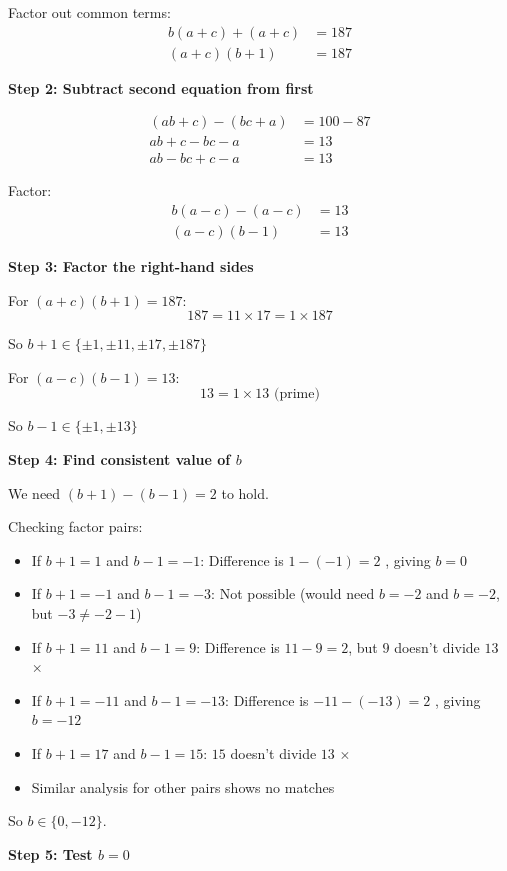 \documentclass[12pt]{article}
\begin{document}
Factor out common terms:
\begin{align*}
b(a + c) + (a + c) &= 187\\
(a + c)(b + 1) &= 187
\end{align*}

\textbf{Step 2: Subtract second equation from first}

\begin{align*}
(ab + c) - (bc + a) &= 100 - 87\\
ab + c - bc - a &= 13\\
ab - bc + c - a &= 13
\end{align*}

Factor:
\begin{align*}
b(a - c) - (a - c) &= 13\\
(a - c)(b - 1) &= 13
\end{align*}

\textbf{Step 3: Factor the right-hand sides}

For $(a+c)(b+1) = 187$:
\[187 = 11 \times 17 = 1 \times 187\]

So $b+1 \in \{\pm 1, \pm 11, \pm 17, \pm 187\}$

For $(a-c)(b-1) = 13$:
\[13 = 1 \times 13 \text{ (prime)}\]

So $b-1 \in \{\pm 1, \pm 13\}$

\textbf{Step 4: Find consistent value of $b$}

We need $(b+1) - (b-1) = 2$ to hold.

Checking factor pairs:
\begin{itemize}
    \item If $b+1 = 1$ and $b-1 = -1$: Difference is $1-(-1) = 2$ \checkmark, giving $b = 0$
    \item If $b+1 = -1$ and $b-1 = -3$: Not possible (would need $b = -2$ and $b = -2$, but $-3 \neq -2-1$)
    \item If $b+1 = 11$ and $b-1 = 9$: Difference is $11-9 = 2$, but $9$ doesn't divide $13$ $\times$
    \item If $b+1 = -11$ and $b-1 = -13$: Difference is $-11-(-13) = 2$ \checkmark, giving $b = -12$
    \item If $b+1 = 17$ and $b-1 = 15$: $15$ doesn't divide $13$ $\times$
    \item Similar analysis for other pairs shows no matches
\end{itemize}

So $b \in \{0, -12\}$.

\textbf{Step 5: Test $b = 0$}
\end{document}
